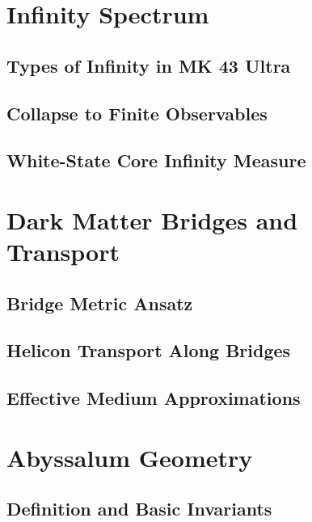 \section{Infinity Spectrum}
\label{app:infinity-spectrum}

\subsection{Types of Infinity in MK 43 Ultra}

\subsection{Collapse to Finite Observables}

\subsection{White-State Core Infinity Measure}

\section{Dark Matter Bridges and Transport}
\label{app:bridges}

\subsection{Bridge Metric Ansatz}

\subsection{Helicon Transport Along Bridges}

\subsection{Effective Medium Approximations}

\section{Abyssalum Geometry}
\label{app:abyssalum}

\subsection{Definition and Basic Invariants}


